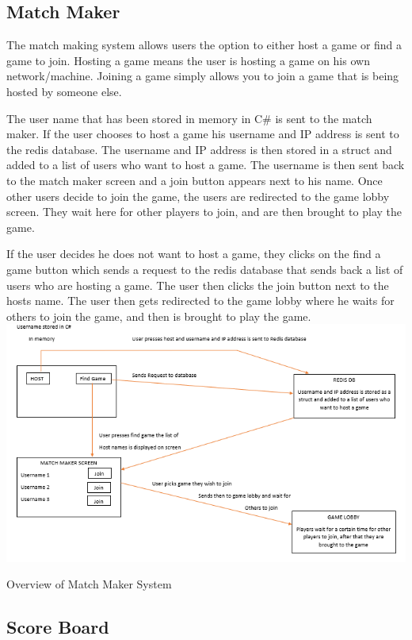 \subsection {Match Maker}\newline
The match making system allows users the option to either host a game or find a game to join. Hosting a game means the user is hosting a game on his own network/machine. Joining a game simply allows you to join a game that is being hosted by someone else.\newline

The user name that has been stored in memory in C\# is sent to the match maker. If the user chooses to host a game his username and IP address is sent to the redis database. The username and IP address is then stored in a struct and added to a list of users who want to host a game. The username is then sent back to the match maker screen and a join button appears next to his name. Once other users decide to join the game, the users are redirected to the game lobby screen. They wait here for other players to join, and are then brought to play the game.\newline

If the user decides he does not want to host a game, they clicks on the find a game button which sends a request to the redis database that sends back a list of users who are hosting a game. The user then clicks the join button next to the hosts name. The user then gets redirected to the game lobby where he waits for others to join the game, and then is brought to play the game. 
\includegraphics[width=1\columnwidth]{img/redisMatch.PNG}

Overview of Match Maker System
\subsection {Score Board}

